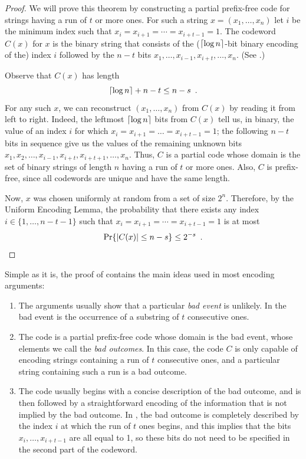 \documentclass{patmorin}
\begin{document}
\begin{proof}
  We will prove this theorem by constructing a partial prefix-free
  code for strings having a run of $t$ or more ones.  For such a
  string $x=(x_1,\ldots,x_n)$ let $i$ be the minimum index such that
  $x_i=x_{i+1}=\cdots=x_{i+t-1}=1$. The codeword $C(x)$ for $x$ is the
  binary string that consists of the (${\lceil \log n \rceil}$-bit binary
  encoding of the) index $i$ followed by the $n-t$ bits
  $x_1,\ldots,x_{i-1},x_{i+t},\ldots,x_n$. (See .)

  Observe that $C(x)$ has length 
  \[
    {\lceil \log n \rceil} + n - t \le n-s \enspace .
  \]
   For any
  such $x$, we can reconstruct $(x_1,\ldots,x_n)$ from $C(x)$ by
  reading it from left to right. Indeed, the leftmost ${\lceil \log n \rceil}$
  bits from $C(x)$ tell us, in binary, the value of an index $i$ for
  which $x_i = x_{i + 1} = \dots = x_{i + t - 1} = 1$; the following
  $n - t$ bits in sequence give us the values of the remaining unknown
  bits
  $x_1, x_2, \dots, x_{i - 1}, x_{i + t}, x_{i + t + 1}, \dots,
  x_n$. Thus, $C$ is a partial code whose domain is the set of binary
  strings of length $n$ having a run of $t$ or more ones.  Also,
  $C$ is prefix-free, since all codewords are unique and have the same length.

  Now, $x$ was chosen uniformly at random from a set of size $2^{n}$.
  Therefore, by the Uniform Encoding Lemma, the probability that there
  exists any index $i\in\{1,\ldots,n-t-1\}$ such that
  $x_i=x_{i+1}=\cdots=x_{i+t-1}=1$ is at most
  \[
    \Pr\{|C(x)|\le n-s\} \le 2^{-s} \enspace . \qedhere 
  \]
\end{proof}

Simple as it is, the proof of  contains the main ideas
used in most encoding arguments: 
\begin{enumerate}
\item The arguments usually show that a particular \emph{bad event} is
  unlikely. In  the bad event is the occurrence of a
  substring of $t$ consecutive ones.

\item The code is a partial prefix-free code whose domain is the bad
  event, whose elements we call the \emph{bad outcomes}. In this case, the code
  $C$ is only capable of encoding strings containing a run of $t$
  consecutive ones, and a particular string containing such a run is a
  bad outcome.

\item The code usually begins with a concise description of the bad
  outcome, and is then followed by a straightforward encoding of the
  information that is not implied by the bad outcome. In
  , the bad outcome is completely described by the index
  $i$ at which the run of $t$ ones begins, and this implies that
  the bits $x_i,\ldots,x_{i+t-1}$ are all equal to 1, so these bits do
  not need to be specified in the second part of the codeword.
\end{enumerate}
\end{document}

